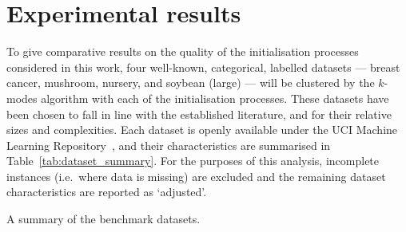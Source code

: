 \section{Experimental results}\label{sec:results}

To give comparative results on the quality of the initialisation processes
considered in this work, four well-known, categorical, labelled datasets ---
breast cancer, mushroom, nursery, and soybean (large) --- will be clustered by
the \(k\)-modes algorithm with each of the initialisation processes. These
datasets have been chosen to fall in line with the established literature, and
for their relative sizes and complexities. Each dataset is openly available
under the UCI Machine Learning Repository~\cite{Dua2019}, and their
characteristics are summarised in Table~\ref{tab:dataset_summary}. For the
purposes of this analysis, incomplete instances (i.e.\ where data is missing)
are excluded and the remaining dataset characteristics are reported as
`adjusted'.

\begin{table}[htbp]
    \resizebox{\textwidth}{!}{%
        
    }\caption{A summary of the benchmark datasets.}\label{tab:dataset_summary}
\end{table}


